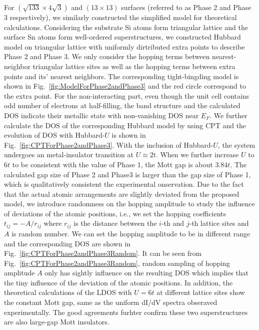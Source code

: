\documentclass[aps,prb,amsfonts,amsmath,amssymb,showpacs,groupedaddress,superscriptaddress]{revtex4-1}
\begin{document}
For $(\sqrt{133} \times 4\sqrt{3})$ and $(13 \times 13)$ surfaces (referred to as Phase 2 and Phase 3 respectively), we similarly constructed the simplified model for theoretical calculations. Considering the substrate Si atoms form triangular lattice and the surface Sn atoms form well-ordered superstructures, we constructed Hubbard model on triangular lattice with uniformly dirtributed extra points to describe Phase 2 and Phase 3. We only consider the hopping terms between nearest-neighbor triangular lattice sites as well as the hopping terms between extra points and its' nearest neighbors. The corresponding tight-bingding model is shown in Fig.~\ref{fig:ModelForPhase2andPhase3} and the red circle correspond to the extra point. For the non-interacting part, even though the unit cell contains odd number of electrons at half-filling, the band structure and the calculated DOS indicate their metallic state with non-vanishing DOS near $E_{F}$. We further calculate the DOS of the corresponding Hubbard model by using CPT and the evolution of DOS with Hubbard-$U$ is shown in Fig.~\ref{fig:CPTForPhase2andPhase3}. With the inclusion of Hubbard-$U$, the system undergoes an metal-insulator transition at $U \approx 2t$. When we further increase $U$ to $6t$ to be consistent with the value of Phase 1, the Mott gap is about $3.84t$. The calculated gap size of
Phase 2 and Phase3 is larger than the gap size of Phase 1, which is qualitatively consistent the experimental onservation. Due to the fact that the actual atomic arrangements are slightly deviated from the proposed model, we introduce randomness on the hopping amplitude to study the influence of deviations of the atomic positions, i.e., we set the hopping coefficients $t_{ij} = -A / r_{ij}$ where $r_{ij}$ is the distance between the $i$-th and $j$-th lattice sites and $A$ is random number. We can set the hopping amplitude to be in different range and the corresponding DOS are shown in Fig.~\ref{fig:CPTForPhase2andPhase3Random}. It can be seen from Fig.~\ref{fig:CPTForPhase2andPhase3Random}, random sampling of hopping amplitude $A$ only has sightly influence on the resulting DOS which implies that the tiny influence of the deviation of the atomic positions. In addition, the theoretical calculations of the LDOS with $U = 6t$ at different lattice sites show the constant Mott gap, same as the uniform dI/dV spectra obseraved experimentally. The good agreements furhter confirm these two superstructures are also large-gap Mott insulators.
\end{document}
